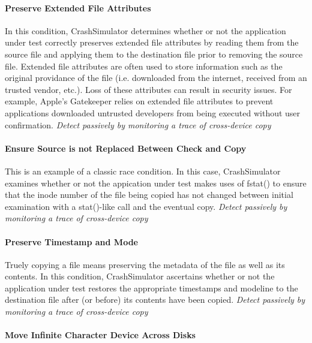         \paragraph{Preserve Extended File Attributes}

        In this condition, CrashSimulator determines whether or not the application under test correctly preserves
        extended file attributes by reading them from the source file and applying them to the destination file prior to
        removing the source file.  Extended file attributes are often used to store information such as the original
        providance of the file (i.e. downloaded from the internet, received from an trusted vendor, etc.).  Loss of
        these attributes can result in security issues. For example, Apple's Gatekeeper relies on extended file
        attributes to prevent applications downloaded untrusted developers from being executed without user
        confirmation. \emph{Detect passively by monitoring a trace of cross-device copy}


        \paragraph{Ensure Source is not Replaced Between Check and Copy}

        This is an example of a classic race condition.  In this case, CrashSimulator examines whether or not the
        appication under test makes uses of fstat() to ensure that the inode number of the file being copied has not
        changed between initial examination with a stat()-like call and the eventual copy. \emph{Detect passively by
          monitoring a trace of cross-device copy}

        \paragraph{Preserve Timestamp and Mode}

        Truely copying a file means preserving the metadata of the file as well as its contents.  In this condition,
        CrashSimulator ascertains whether or not the application under test restores the appropriate timestamps and
        modeline to the destination file after (or before) its contents have been copied. \emph{Detect passively by
          monitoring a trace of cross-device copy}

        \paragraph{Move Infinite Character Device Across Disks}

